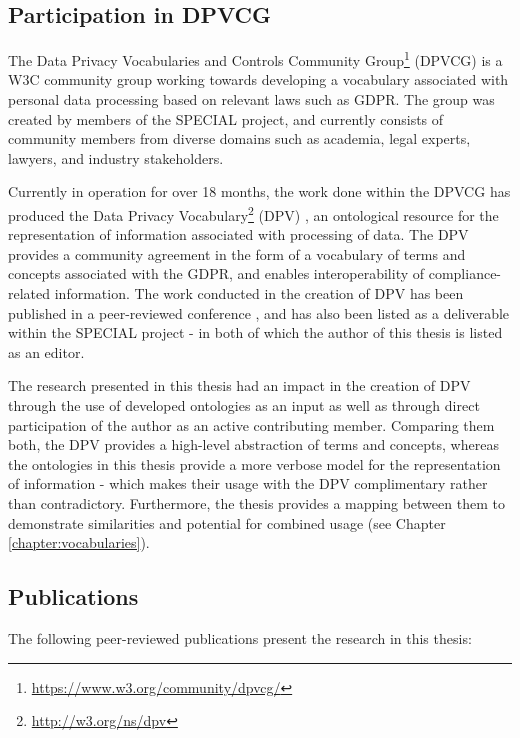 \subsection{Participation in DPVCG}\label{sec:intro:dpvcg}
The Data Privacy Vocabularies and Controls Community Group\footnote{\url{https://www.w3.org/community/dpvcg/}} (DPVCG) is a W3C community group working towards developing a vocabulary associated with personal data processing based on relevant laws such as GDPR.
The group was created by members of the SPECIAL project, and currently consists of community members from diverse domains such as academia, legal experts, lawyers, and industry stakeholders.

Currently in operation for over 18 months, the work done within the DPVCG has produced the Data Privacy Vocabulary\footnote{\url{http://w3.org/ns/dpv}} (DPV) , an ontological resource for the representation of information associated with processing of data.
The DPV provides a community agreement in the form of a vocabulary of terms and concepts associated with the GDPR, and enables interoperability of compliance-related information.
The work conducted in the creation of DPV has been published in a peer-reviewed conference \cite{pandit_dpv_2019}, and has also been listed as a deliverable within the SPECIAL project \cite{pandit_d6.5_2019} - in both of which the author of this thesis is listed as an editor.

The research presented in this thesis had an impact in the creation of DPV through the use of developed ontologies as an input as well as through direct participation of the author as an active contributing member.
Comparing them both, the DPV provides a high-level abstraction of terms and concepts, whereas the ontologies in this thesis provide a more verbose model for the representation of information - which makes their usage with the DPV complimentary rather than contradictory.
Furthermore, the thesis provides a mapping between them to demonstrate similarities and potential for combined usage (see Chapter \ref{chapter:vocabularies}).

\subsection{Publications}\label{sec:intro:publications}
The following peer-reviewed publications present the research in this thesis:

